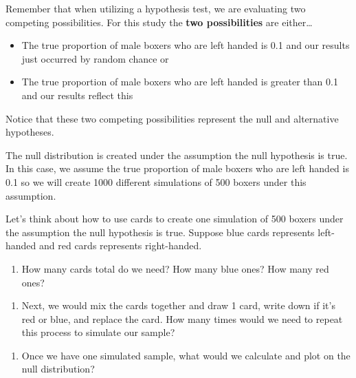 \documentclass[
]{report}
\providecommand{\tightlist}{%
  \setlength{\itemsep}{0pt}\setlength{\parskip}{0pt}}
\begin{document}
\vspace{0.5in}

Remember that when utilizing a hypothesis test, we are evaluating two competing possibilities. For this study the \textbf{two possibilities} are either\ldots{}

\begin{itemize}
\item
  The true proportion of male boxers who are left handed is 0.1 and our results just occurred by random chance or
\item
  The true proportion of male boxers who are left handed is greater than 0.1 and our results reflect this
\end{itemize}

Notice that these two competing possibilities represent the null and alternative hypotheses.

The null distribution is created under the assumption the null hypothesis is true. In this case, we assume the true proportion of male boxers who are left handed is 0.1 so we will create 1000 different simulations of 500 boxers under this assumption.

Let's think about how to use cards to create one simulation of 500 boxers under the assumption the null hypothesis is true. Suppose blue cards represents left-handed and red cards represents right-handed.

\begin{enumerate}
\def\labelenumi{\arabic{enumi}.}
\setcounter{enumi}{14}
\tightlist
\item
  How many cards total do we need? How many blue ones? How many red ones?
\end{enumerate}

\vspace{0.5in}

\begin{enumerate}
\def\labelenumi{\arabic{enumi}.}
\setcounter{enumi}{15}
\tightlist
\item
  Next, we would mix the cards together and draw 1 card, write down if it's red or blue, and replace the card. How many times would we need to repeat this process to simulate our sample?
\end{enumerate}

\vspace{0.5in}

\begin{enumerate}
\def\labelenumi{\arabic{enumi}.}
\setcounter{enumi}{16}
\tightlist
\item
  Once we have one simulated sample, what would we calculate and plot on the null distribution?
  \vspace{1in}
\end{enumerate}
\end{document}
